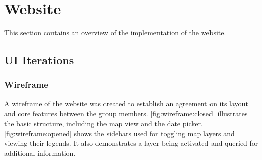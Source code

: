 \section{Website}

This section contains an overview of the implementation of the website.

\subsection{UI Iterations} %

\subsubsection*{Wireframe}
A wireframe of the website was created to establish an agreement on its layout and core features between the group members. \autoref{fig:wireframe:closed} illustrates the basic structure, including the map view and the date picker. \autoref{fig:wireframe:opened}   shows the sidebars used for toggling map layers and viewing their legends. It also demonstrates a layer being activated and queried for additional information. 

